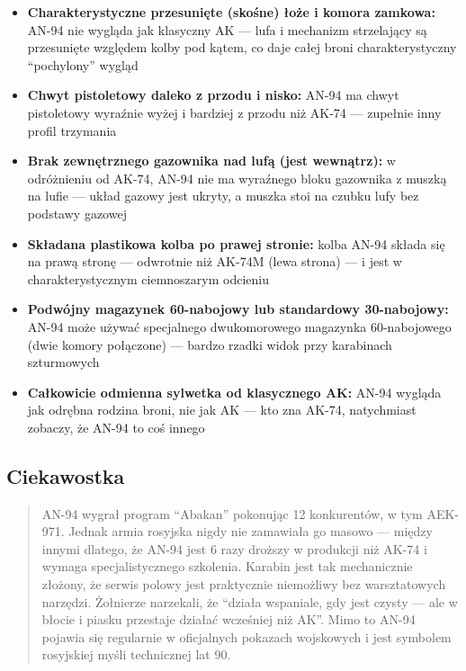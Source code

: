 \documentclass[12pt,oneside]{book}
\providecommand{\tightlist}{%
  \setlength{\itemsep}{0pt}\setlength{\parskip}{0pt}}
\begin{document}
\begin{itemize}
\tightlist
\item
  \textbf{Charakterystyczne przesunięte (skośne) łoże i komora zamkowa:}
  AN-94 nie wygląda jak klasyczny AK --- lufa i mechanizm strzelający są
  przesunięte względem kolby pod kątem, co daje całej broni
  charakterystyczny ``pochylony'' wygląd
\item
  \textbf{Chwyt pistoletowy daleko z przodu i nisko:} AN-94 ma chwyt
  pistoletowy wyraźnie wyżej i bardziej z przodu niż AK-74 --- zupełnie
  inny profil trzymania
\item
  \textbf{Brak zewnętrznego gazownika nad lufą (jest wewnątrz):} w
  odróżnieniu od AK-74, AN-94 nie ma wyraźnego bloku gazownika z muszką
  na lufie --- układ gazowy jest ukryty, a muszka stoi na czubku lufy
  bez podstawy gazowej
\item
  \textbf{Składana plastikowa kolba po prawej stronie:} kolba AN-94
  składa się na prawą stronę --- odwrotnie niż AK-74M (lewa strona) ---
  i jest w charakterystycznym ciemnoszarym odcieniu
\item
  \textbf{Podwójny magazynek 60-nabojowy lub standardowy 30-nabojowy:}
  AN-94 może używać specjalnego dwukomorowego magazynka 60-nabojowego
  (dwie komory połączone) --- bardzo rzadki widok przy karabinach
  szturmowych
\item
  \textbf{Całkowicie odmienna sylwetka od klasycznego AK:} AN-94 wygląda
  jak odrębna rodzina broni, nie jak AK --- kto zna AK-74, natychmiast
  zobaczy, że AN-94 to coś innego
\end{itemize}

\subsection{Ciekawostka}\label{ciekawostka-65}

\begin{quote}
AN-94 wygrał program ``Abakan'' pokonując 12 konkurentów, w tym AEK-971.
Jednak armia rosyjska nigdy nie zamawiała go masowo --- między innymi
dlatego, że AN-94 jest 6 razy droższy w produkcji niż AK-74 i wymaga
specjalistycznego szkolenia. Karabin jest tak mechanicznie złożony, że
serwis polowy jest praktycznie niemożliwy bez warsztatowych narzędzi.
Żołnierze narzekali, że ``działa wspaniale, gdy jest czysty --- ale w
błocie i piasku przestaje działać wcześniej niż AK''. Mimo to AN-94
pojawia się regularnie w oficjalnych pokazach wojskowych i jest symbolem
rosyjskiej myśli technicznej lat 90.
\end{quote}
\end{document}
